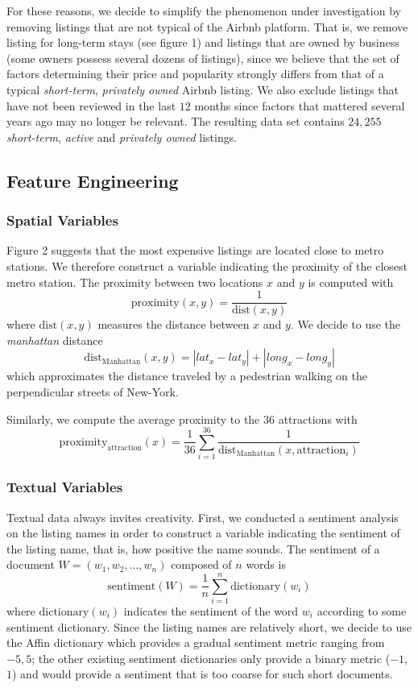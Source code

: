 \documentclass[10pt]{jmlr}%
\begin{document}
For these reasons, we decide to simplify the phenomenon under investigation by removing listings that are not typical of the Airbnb platform. That is, we remove listing for long-term stays (see figure 1) and listings that are owned by business (some owners possess several dozens of listings), since we believe that the set of factors determining their price and popularity strongly differs from that of a typical \textit{short-term}, \textit{privately owned} Airbnb listing. We also exclude listings that have not been reviewed in the last $12$ months since factors that mattered several years ago may no longer be relevant. The resulting data set contains $24,255$ \textit{short-term}, \textit{active} and \textit{privately owned} listings.

\subsection{Feature Engineering}
\label{sec:feature}
\subsubsection{Spatial Variables}
Figure 2 suggests that the most expensive listings are located close to metro stations. We therefore construct a variable indicating the proximity of the closest metro station. The proximity between two locations $x$ and $y$ is computed with
$$\text{proximity}(x,y) = \dfrac{1}{\text{dist}(x,y)}$$
where $\text{dist}(x,y)$ measures the distance between $x$ and $y$. We decide to use the \textit{manhattan} distance
$$\text{dist}_{\text{Manhattan}}(x,y) = |lat_x - lat_y| + |long_x - long_y|$$
which approximates the distance traveled by a pedestrian walking on the perpendicular streets of New-York.

Similarly, we compute the average proximity to the $36$ attractions with
$$\text{proximity}_\text{attraction}(x) = \dfrac{1}{36} \sum_{i=1}^{36} \dfrac{1}{\text{dist}_{\text{Manhattan}}(x,\text{attraction}_i)}$$

\subsubsection{Textual Variables}
Textual data always invites creativity. First, we conducted a sentiment analysis on the listing names in order to construct a variable indicating the sentiment of the listing name, that is, how positive the name sounds. The sentiment of a document $W = (w_1, w_2, \dots, w_n)$ composed of $n$ words is
$$\text{sentiment}(W) = \dfrac{1}{n} \sum_{i=1}^{n} \text{dictionary}(w_i)$$
where $\text{dictionary}(w_i)$ indicates the sentiment of the word $w_i$ according to some sentiment dictionary. Since the listing names are relatively short, we decide to use the Affin dictionary which provides a gradual sentiment metric ranging from $-5, 5$; the other existing sentiment dictionaries only provide a binary metric ($-1$, $1$) and would provide a sentiment that is too coarse for such short documents.
\end{document}
